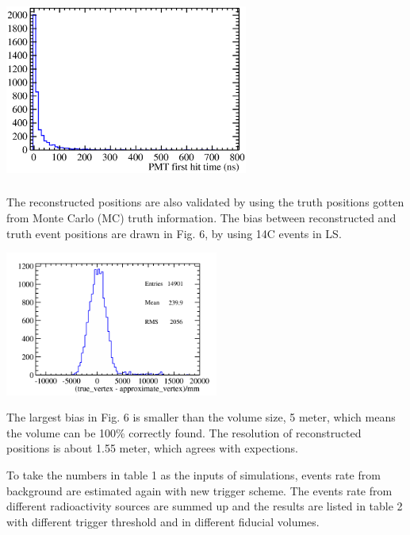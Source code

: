 \documentclass[a4paper,10pt,twoside]{paper}
\begin{document}
\begin{multicols}{2}
		\begin{center}
			\includegraphics[width=8cm,height=6cm]{4MeV_e+_PMT_first_hitTime_corrected.eps}
		\end{center}


		The reconstructed positions are also validated by using the truth positions gotten from Monte Carlo (MC) truth information. 
		The bias between reconstructed and truth event positions are drawn in Fig. 6, by using 14C events in LS. 

		\begin{center}
			\includegraphics[width=7cm]{C14_deltaR.png}
		\end{center}

		The largest bias in Fig. 6 is smaller than the volume size, 5 meter, which means the volume can be 100\% correctly found.
		The resolution of reconstructed positions is about 1.55 meter, which agrees with expections.


		To take the numbers in table 1 as the inputs of simulations, events rate from background are estimated again with new trigger scheme. 
		The events rate from different radioactivity sources are summed up and the results are listed in table 2 with different trigger threshold and in
		different fiducial volumes.


	\end{multicols}
\end{document}

